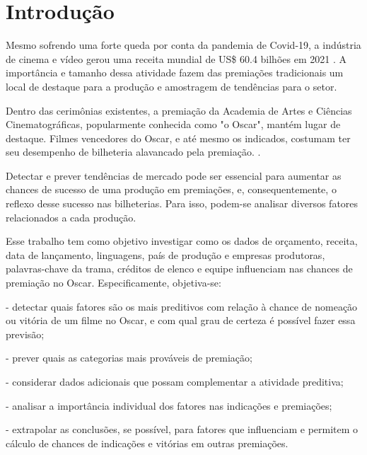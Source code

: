 
\chapter[Introdução]{Introdução}
Mesmo sofrendo uma forte queda por conta da pandemia de Covid-19, a indústria de cinema e vídeo gerou uma receita mundial de US\$ 60.4 bilhões em 2021 \cite{indiantelevision2021}. A importância e tamanho dessa atividade fazem das premiações tradicionais um local de destaque para a produção e amostragem de tendências para o setor.\par
Dentro das cerimônias existentes, a premiação da Academia de Artes e Ciências Cinematográficas, popularmente conhecida como "o Oscar", mantém lugar de destaque. Filmes vencedores do Oscar, e até mesmo os indicados, costumam ter seu desempenho de bilheteria alavancado pela premiação. \cite{hdsr2020}.

Detectar e prever tendências de mercado pode ser essencial para aumentar as chances de sucesso de uma produção em premiações, e, consequentemente, o reflexo desse sucesso nas bilheterias. Para isso, podem-se analisar diversos fatores relacionados a cada produção.\par

Esse trabalho tem como objetivo investigar como os dados de orçamento, receita, data de lançamento, linguagens, país de produção e empresas produtoras, palavras-chave da trama, créditos de elenco e equipe influenciam nas chances de premiação no Oscar. Especificamente, objetiva-se:\par

- detectar quais fatores são os mais preditivos com relação à chance de nomeação ou vitória de um filme no Oscar, e com qual grau de certeza é possível fazer essa previsão;\par
- prever quais as categorias mais prováveis de premiação;\par
- considerar dados adicionais que possam complementar a atividade preditiva;\par
- analisar a importância individual dos fatores nas indicações e premiações;\par
- extrapolar as conclusões, se possível, para fatores que influenciam e permitem o cálculo de chances de indicações e vitórias em outras premiações.\par
\par

